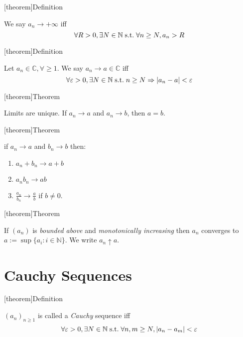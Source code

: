 \documentclass[12pt]{report}
\theoremstyle{definition}
\begin{document}
[theorem]{Definition}
\begin{approach to infinity}
    We say $a_n \rightarrow +\infty$ iff \[
        \forall R > 0, \exists N \in \mathbb{N} \;\textnormal{s.t.}\; \forall n \ge N, a_n > R
    \]
\end{approach to infinity}


[theorem]{Definition}
\begin{convergent complex sequence}
    Let $a_n \in \mathbb{C}, \forall \ge 1$. We say $a_n \rightarrow a \in \mathbb{C}$ iff \[
        \forall \varepsilon > 0, \exists N \in \mathbb{N} \;\textnormal{s.t.}\; n \ge N 
        \Rightarrow |a_n - a| < \varepsilon
    \]
\end{convergent complex sequence}

[theorem]{Theorem}
\begin{uniqueness of limits}
    Limits are unique. If $a_n \rightarrow a$ and $a_n \rightarrow b$, then $a = b$.
\end{uniqueness of limits}

[theorem]{Theorem}
\begin{algebra of limits}
    if $a_n \rightarrow a$ and $b_n \rightarrow b$ then:
    \begin{enumerate}
        \item $a_n + b_n \rightarrow a + b$
        \item $a_n b_n \rightarrow ab$
        \item $\frac{a_n}{b_n} \rightarrow \frac{a}{b}$ if $b \neq 0$.
    \end{enumerate}
\end{algebra of limits}

[theorem]{Theorem}
\begin{monotonically increasing to converge}
    If $(a_n)$ is \emph{bounded above} and \emph{monotonically increasing} then $a_n$ converges to
    $a := \sup{\{a_i : i \in \mathbb{N}\}}$. We write $a_n \uparrow a$.
\end{monotonically increasing to converge}

\section{Cauchy Sequences}
[theorem]{Definition}
\begin{cauchy sequences}
    ${(a_n)}_{n \ge 1}$ is called a \emph{Cauchy} sequence iff \[
        \forall \varepsilon > 0, \exists N \in \mathbb{N} \;\textnormal{s.t.}\; 
        \forall n,m \ge N, |a_n - a_m| < \varepsilon
    \]
\end{cauchy sequences}
\end{document}
